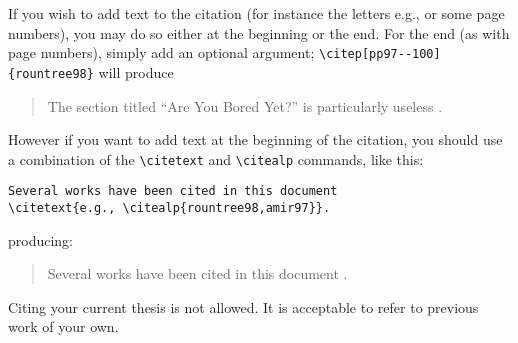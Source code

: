 If you wish to add text to the citation (for instance the letters
e.g., or some page numbers), you may do so either at the beginning or
the end.  For the end (as with page numbers), simply add an optional
argument; \verb|\citep[pp97--100]{rountree98}| will produce
\begin{quote}
The section titled ``Are You Bored Yet?'' is particularly useless
\citep[pp97--100]{rountree98}.
\end{quote}
However if you want to add text at the beginning of the citation, you
should use a combination of the \verb|\citetext| and \verb|\citealp|
commands, like this:
\begin{verbatim}
Several works have been cited in this document
\citetext{e.g., \citealp{rountree98,amir97}}.
\end{verbatim}
producing:
\begin{quote}
Several works have been cited in this document
\citetext{e.g., \citealp{rountree98,amir97}}.
\end{quote}

Citing your current thesis is not allowed.  It is acceptable to refer to
previous work of your own. 
